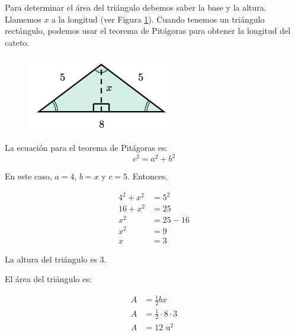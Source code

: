 \begin{solutionbox}{6cm} \footnotesize
    Para determinar el área del triángulo debemos saber la base y la altura. Llamemos $x$ a la longitud (ver Figura \ref{fig:area_isoseles_03a}).
    Cuando tenemos un triángulo rectángulo, podemos usar el teorema de Pitágoras para obtener la longitud del cateto.
    \begin{figure}
        \centering
        \includegraphics[width=0.9\linewidth]{../images/area_isoseles_03a.png}
        \caption{}
        \label{fig:area_isoseles_03a}
    \end{figure}
    La ecuación para el teorema de Pitágoras es:
    \[c^2=a^2+b^2\]

    \begin{multicols}{2}
        En este caso, $a=4$, $b=x$ y $c=5$. Entonces,

        \begin{align*}
            4^2+x^2 & =5^2   \\
            16+x^2  & =25    \\
            x^2     & =25-16 \\
            x^2     & =9     \\
            x       & =3
        \end{align*}

        La altura del triángulo es 3.
        
        \columnbreak
        
        El área del triángulo es:

        \begin{align*}
            A & =\frac{1}{2}bx             \\
            A & =\frac{1}{2}\cdot 8\cdot 3 \\
            A & =12 \text{ u}^2
        \end{align*}
    \end{multicols}
\end{solutionbox}


